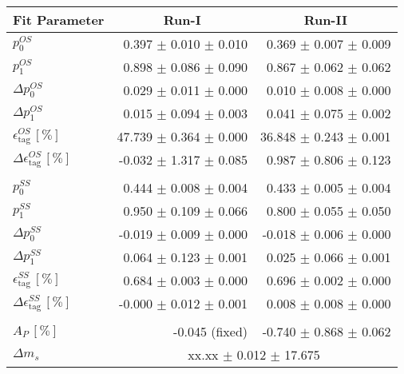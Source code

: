 \begin{tabular}{l r r } 
\hline
\hline
\multicolumn{1}{c}{Fit Parameter} & \multicolumn{1}{c}{Run-I} & \multicolumn{1}{c}{Run-II}  \\ 
\hline
$p_{0}^{OS}$ & 0.397 $\pm$ 0.010 $\pm$ 0.010 & 0.369 $\pm$ 0.007 $\pm$ 0.009 \\ 
$p_{1}^{OS}$ & 0.898 $\pm$ 0.086 $\pm$ 0.090 & 0.867 $\pm$ 0.062 $\pm$ 0.062 \\ 
$\Delta p_{0}^{OS}$ & 0.029 $\pm$ 0.011 $\pm$ 0.000 & 0.010 $\pm$ 0.008 $\pm$ 0.000 \\ 
$\Delta p_{1}^{OS}$ & 0.015 $\pm$ 0.094 $\pm$ 0.003 & 0.041 $\pm$ 0.075 $\pm$ 0.002 \\ 
$\epsilon_{\text{tag}}^{OS} \, [\%]$ & 47.739 $\pm$ 0.364 $\pm$ 0.000 & 36.848 $\pm$ 0.243 $\pm$ 0.001 \\ 
$\Delta \epsilon_{\text{tag}}^{OS} \, [\%]$ & -0.032 $\pm$ 1.317 $\pm$ 0.085 & 0.987 $\pm$ 0.806 $\pm$ 0.123 \\ 
 \\ 
$p_{0}^{SS}$ & 0.444 $\pm$ 0.008 $\pm$ 0.004 & 0.433 $\pm$ 0.005 $\pm$ 0.004 \\ 
$p_{1}^{SS}$ & 0.950 $\pm$ 0.109 $\pm$ 0.066 & 0.800 $\pm$ 0.055 $\pm$ 0.050 \\ 
$\Delta p_{0}^{SS}$ & -0.019 $\pm$ 0.009 $\pm$ 0.000 & -0.018 $\pm$ 0.006 $\pm$ 0.000 \\ 
$\Delta p_{1}^{SS}$ & 0.064 $\pm$ 0.123 $\pm$ 0.001 & 0.025 $\pm$ 0.066 $\pm$ 0.001 \\ 
$\epsilon_{\text{tag}}^{SS} \, [\%]$ & 0.684 $\pm$ 0.003 $\pm$ 0.000 & 0.696 $\pm$ 0.002 $\pm$ 0.000 \\ 
$\Delta \epsilon_{\text{tag}}^{SS} \, [\%]$ & -0.000 $\pm$ 0.012 $\pm$ 0.001 & 0.008 $\pm$ 0.008 $\pm$ 0.000 \\ 
 \\ 
$A_{P} \, [\%]$ & -0.045 (fixed) & -0.740 $\pm$ 0.868 $\pm$ 0.062 \\ 
\hline
$\Delta m_{s}$ & \multicolumn{2}{c}{ xx.xx $\pm$ 0.012 $\pm$ 17.675 }  \\ 
\hline
\hline
\end{tabular}
